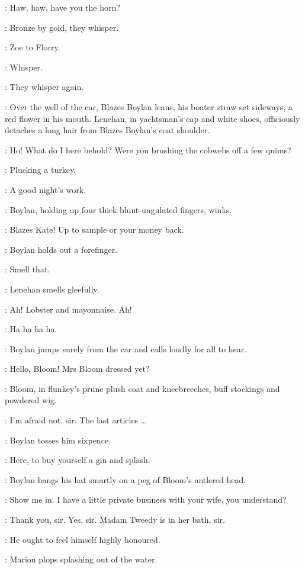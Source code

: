 \Boots:
Haw, haw, have you the horn?

:
Bronze by gold, they whisper.

:
Zoe to Florry.

\Zoe:
Whisper.

:
They whisper again.

:
Over the well of the car, Blazes Boylan leans,
his boater straw set sideways, a red flower in his mouth.
Lenehan, in yachtsman's cap and white shoes,
officiously detaches a long hair from Blazes Boylan's coat shoulder.

\Lenehan:
Ho!
What do I here behold?
Were you brushing the cobwebs off a few quims?

\Boylan:
Plucking a turkey.

\Lenehan:
A good night's work.

:
Boylan, holding up four thick blunt-ungulated fingers, winks.

\Boylan:
Blazes Kate!
Up to sample or your money back.

:
Boylan holds out a forefinger.

\Boylan:
Smell that.

:
Lenehan smells gleefully.

\Lenehan:
Ah!
Lobster and mayonnaise.
Ah!

\ZoeAndFlorry:
Ha ha ha ha.

:
Boylan jumps surely from the car and calls loudly for all to hear.

\Boylan:
Hello, Bloom!
Mrs Bloom dressed yet?

:
Bloom, in flunkey's prune plush coat and kneebreeches,
buff stockings and powdered wig.

\Bloom:
I'm afraid not, sir.
The last articles \ldots

:
Boylan tosses him sixpence.

\Boylan:
Here, to buy yourself a gin and splash.

:
Boylan hangs his hat smartly on a peg of Bloom's antlered head.

\Boylan:
Show me in.
I have a little private business with your wife, you understand?

\Bloom:
Thank you, sir.
Yes, sir.
Madam Tweedy is in her bath, sir.

\Marion[1]:
He ought to feel himself highly honoured.

:
Marion plops splashing out of the water.

